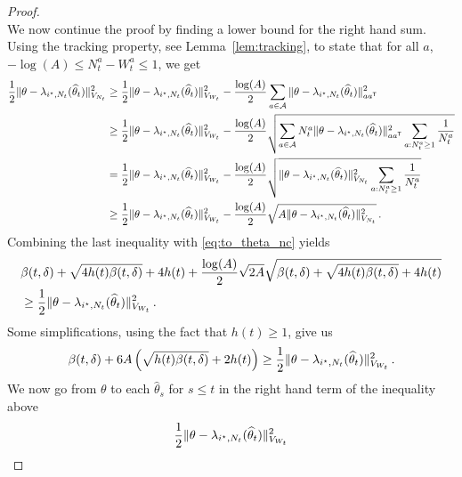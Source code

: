 \begin{proof}
\begin{equation}
\end{equation}
We now continue the proof by finding a lower bound for the right hand sum. Using the tracking property, see Lemma~\ref{lem:tracking}, to state that for all $a$, $- \log(A) \le N_t^{a} - W_t^{a}\le 1$, we get
\begin{align*}
\frac{1}{2} \Vert \theta - \lambda_{i^\star,N_t}(\widehat{\theta}_t) \Vert_{V_{N_t}}^2
&\ge \frac{1}{2} \Vert \theta - \lambda_{i^\star,N_t}(\widehat{\theta}_t) \Vert_{V_{W_t}}^2
	- \frac{\log(A)}{2} \sum_{a\in\mathcal{A}} \Vert \theta - \lambda_{i^\star,N_t}(\widehat{\theta}_t) \Vert_{a a^{\mathsf{\scriptscriptstyle T}}}^2
\\
&\ge \frac{1}{2} \Vert \theta - \lambda_{i^\star,N_t}(\widehat{\theta}_t) \Vert_{V_{W_t}}^2
	- \frac{\log(A)}{2} \sqrt{\sum_{a\in\mathcal{A}} N_t^{a}\Vert \theta - \lambda_{i^\star,N_t}(\widehat{\theta}_t) \Vert_{a a^{\mathsf{\scriptscriptstyle T}}}^2\sum_{a:N_t^a\ge 1} \frac{1}{N_t^a}   }
\\
&=   \frac{1}{2} \Vert \theta - \lambda_{i^\star,N_t}(\widehat{\theta}_t) \Vert_{V_{W_t}}^2
	- \frac{\log(A)}{2} \sqrt{\Vert \theta - \lambda_{i^\star,N_t}(\widehat{\theta}_t) \Vert_{V_{N_t}}^2\sum_{a:N_t^a\ge 1} \frac{1}{N_t^a}   }
\\
&\ge \frac{1}{2} \Vert \theta - \lambda_{i^\star,N_t}(\widehat{\theta}_t) \Vert_{V_{W_t}}^2
	-\frac{\log(A)}{2} \sqrt{ A \Vert \theta - \lambda_{i^\star,N_t}(\widehat{\theta}_t) \Vert_{V_{N_t}}^2  }\,.
\end{align*}
Combining the last inequality with \eqref{eq:to_theta_nc} yields
\begin{align*}
    &\beta(t,\delta) + \sqrt{4 h(t) \beta(t,\delta)} +4h(t)+\frac{\log(A)}{2} \sqrt{2 A}\sqrt{\beta(t,\delta) + \sqrt{4 h(t) \beta(t,\delta)} +4h(t)}\\
    &\geq \frac{1}{2} \Vert \theta - \lambda_{i^\star,N_t}(\widehat{\theta}_t) \Vert_{V_{W_t}}^2\,.
\end{align*}
Some simplifications, using the fact that $h(t)\geq 1 $, give us
\begin{equation}
  \label{eq:to_tW_nc}
  \beta(t,\delta)+6A\left( \sqrt{h(t)\beta(t,\delta)}+2h(t)\right)
  \geq  \frac{1}{2} \Vert \theta - \lambda_{i^\star,N_t}(\widehat{\theta}_t) \Vert_{V_{W_t}}^2\,.
\end{equation}
We now go from $\theta$ to each $\hat{\theta}_s$ for $s \le t$ in the right hand term of the inequality above
\begin{align}
\frac{1}{2}\Vert \theta - \lambda_{\istar,N_t}(\hat{\theta}_t) \Vert_{V_{W_t}}^2

\end{align}
\end{proof}
